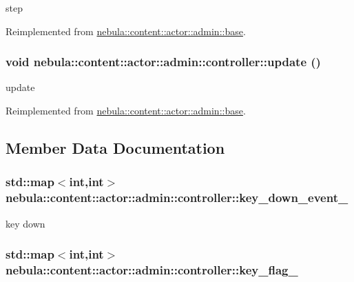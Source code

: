 step 

Reimplemented from \hyperlink{classnebula_1_1content_1_1actor_1_1admin_1_1base_ac66cc3aa153fa2d6e45f1195d2027052}{nebula::content::actor::admin::base}.\hypertarget{classnebula_1_1content_1_1actor_1_1admin_1_1controller_ac86d7c729afb23839db48bde2e52dcc6}{
\subsubsection[{update}]{\setlength{\rightskip}{0pt plus 5cm}void nebula::content::actor::admin::controller::update ()}}
\label{classnebula_1_1content_1_1actor_1_1admin_1_1controller_ac86d7c729afb23839db48bde2e52dcc6}


update 

Reimplemented from \hyperlink{classnebula_1_1content_1_1actor_1_1admin_1_1base_a1401d047ad4b2459a047644da275cebf}{nebula::content::actor::admin::base}.

\subsection{Member Data Documentation}
\hypertarget{classnebula_1_1content_1_1actor_1_1admin_1_1controller_a04e8a5bdd18017802846a2bc18f398b7}{
\subsubsection[{key\_\-down\_\-event\_\-}]{\setlength{\rightskip}{0pt plus 5cm}std::map$<$int,int$>$ {\bf nebula::content::actor::admin::controller::key\_\-down\_\-event\_\-}}}
\label{classnebula_1_1content_1_1actor_1_1admin_1_1controller_a04e8a5bdd18017802846a2bc18f398b7}


key down \hypertarget{classnebula_1_1content_1_1actor_1_1admin_1_1controller_a797fbec85cc80474e36907e48787de8f}{
\subsubsection[{key\_\-flag\_\-}]{\setlength{\rightskip}{0pt plus 5cm}std::map$<$int,int$>$ {\bf nebula::content::actor::admin::controller::key\_\-flag\_\-}}}
\label{classnebula_1_1content_1_1actor_1_1admin_1_1controller_a797fbec85cc80474e36907e48787de8f}


